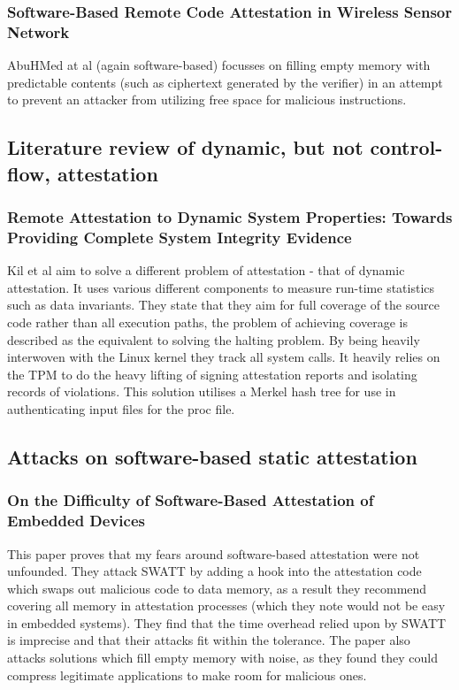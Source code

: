 \subsubsection{Software-Based Remote Code Attestation in Wireless Sensor Network}

AbuHMed at al \cite{AbuHmed2009} (again software-based) focusses on filling empty memory with predictable contents (such as ciphertext generated by the verifier) in an attempt to prevent an attacker from utilizing free space for malicious instructions.

\subsection{Literature review of dynamic, but not control-flow, attestation}

\subsubsection{Remote Attestation to Dynamic System Properties: Towards Providing Complete System Integrity Evidence}

Kil et al \cite{Kil2009} aim to solve a different problem of attestation - that of dynamic attestation. It uses various different components to measure run-time statistics such as data invariants. They state that they aim for full coverage of the source code rather than all execution paths, the problem of achieving coverage is described as the equivalent to solving the halting problem. By being heavily interwoven with the Linux kernel they track all system calls. It heavily relies on the TPM to do the heavy lifting of signing attestation reports and isolating records of violations. This solution utilises a Merkel hash tree for use in authenticating input files for the proc file.

\subsection{Attacks on software-based static attestation}

\subsubsection{On the Difficulty of Software-Based Attestation of Embedded Devices}

This paper \cite{Castelluccia2009} proves that my fears around software-based attestation were not unfounded. They attack SWATT \cite{Seshadri2004} by adding a hook into the attestation code which swaps out malicious code to data memory, as a result they recommend covering all memory in attestation processes (which they note would not be easy in embedded systems). They find that the time overhead relied upon by SWATT \cite{Seshadri2004} is imprecise and that their attacks fit within the tolerance. The paper also attacks solutions which fill empty memory with noise, as they found they could compress legitimate applications to make room for malicious ones.

